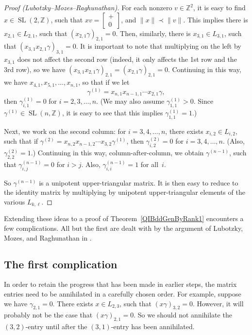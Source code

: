 \documentclass[pdftex]{sigma}
\newcommand{\ZZ}{\mathbb{Z}}
\DeclareMathOperator{\SL}{SL}
\numberwithin{equation}{section}
\theoremstyle{definition}
\begin{document}
\begin{proof}[Proof \normalfont (Lubotzky--Mozes--Raghunathan)]
For each nonzero $v \in \ZZ^2$, it is easy to find $x \in \SL(2,\ZZ)$, such that $xv = \left[\begin{smallmatrix} + \\ 0 \end{smallmatrix}\right]$, and $\| x \| \prec \| v \|$.
	This implies there is $x_{2,1} \in L_{2,1}$, such that $(x_{2,1} \gamma)_{2,1} = 0$.
	Then, similarly, there is $x_{3,1} \in L_{3,1}$, such that $(x_{3,1} x_{2,1} \gamma)_{3,1} = 0$. It is important to note that multiplying on the left by $x_{3,1}$ does not affect the second row (indeed, it only affects the 1st row and the 3rd row), so we have $(x_{3,1} x_{2,1} \gamma)_{2,1} = (x_{2,1} \gamma)_{2,1} = 0$. Continuing in this way, we have $x_{4,1}, x_{5,1}, \ldots, x_{n,1}$, so that if we let
\[\gamma^{(1)} = x_{n,1} x_{n-1,1} \cdots x_{2,1} \gamma ,\]
then $\gamma^{(1)}_{i,1} = 0$ for $i = 2,3,\ldots, n$.
(We may also assume $\gamma^{(1)}_{1,1} > 0$. Since $\gamma^{(1)} \in \SL(n, \ZZ)$, it is easy to see that this implies $\gamma^{(1)}_{1,1} = 1$.)

Next, we work on the second column: for $i = 3,4, \ldots, n$, there exists $x_{i,2} \in L_{i,2}$, such that if $\gamma^{(2)} = x_{n,2} x_{n-1,2} \cdots x_{3,2} \gamma^{(1)}$, then $\gamma^{(2)}_{i,2} = 0$ for $i = 3,4,\ldots,n$. (Also, $\gamma^{(2)}_{2,2} = 1$.)
Continuing in this way, column-after-column, we obtain $\gamma^{(n-1)}$, such that $\gamma^{(n-1)}_{i,j} = 0$ for $i > j$. Also, $\gamma^{(n-1)}_{i,i} =1$ for all~$i$.

So $\gamma^{(n-1)}$ is a unipotent upper-triangular matrix. It is then easy to reduce to the identity matrix by multiplying by unipotent upper-triangular elements of the various $L_{k,\ell}$.
\end{proof}

Extending these ideas to a proof of Theorem~\ref{QIBddGenByRank1} encounters a few complications. All but the first are dealt with by the argument of Lubotzky, Mozes, and Raghunathan in \cite[Section~4]{MR1828742}.

\subsection*{The first complication}
In order to retain the progress that has been made in earlier steps, the matrix entries need to be annihilated in a carefully chosen order.
For example, suppose we have $\gamma_{2,1} = 0$. There exists $x \in L_{2,3}$, such that $(x \gamma)_{3,2} = 0$. However, it will probably not be the case that $(x \gamma)_{2,1} = 0$. So we should not annihilate the $(3,2)$-entry until after the $(3,1)$-entry has been annihilated.
\end{document}
